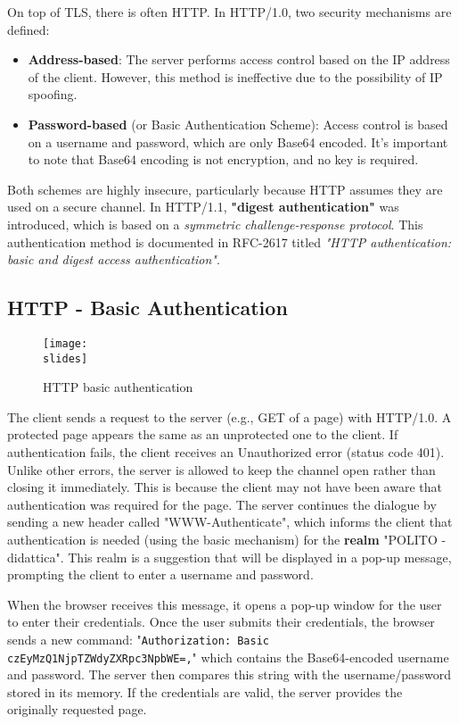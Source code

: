 On top of TLS, there is often HTTP. In HTTP/1.0, two security mechanisms are defined:

\begin{itemize}
    \item \textbf{Address-based}: The server performs access control based on the IP address of the client. However, this method is ineffective due to the possibility of IP spoofing.
    
    \item \textbf{Password-based} (or Basic Authentication Scheme): Access control is based on a username and password, which are only Base64 encoded. It's important to note that Base64 encoding is not encryption, and no key is required.
\end{itemize}

Both schemes are highly insecure, particularly because HTTP assumes they are used on a secure channel. In HTTP/1.1, \textbf{"digest authentication"} was introduced, which is based on a \textit{symmetric challenge-response protocol}. This authentication method is documented in RFC-2617 titled \textit{"HTTP authentication: basic and digest access authentication"}.


\subsection{HTTP - Basic Authentication}

\begin{figure}[h]
    \centering
    \texttt{[image: \\slides]}
    \caption{HTTP basic authentication}
\end{figure}

The client sends a request to the server (e.g., GET of a page) with HTTP/1.0. A protected page appears the same as an unprotected one to the client. If authentication fails, the client receives an Unauthorized error (status code 401). Unlike other errors, the server is allowed to keep the channel open rather than closing it immediately. This is because the client may not have been aware that authentication was required for the page. The server continues the dialogue by sending a new header called "WWW-Authenticate", which informs the client that authentication is needed (using the basic mechanism) for the \textbf{realm} "POLITO - didattica". This realm is a suggestion that will be displayed in a pop-up message, prompting the client to enter a username and password.

When the browser receives this message, it opens a pop-up window for the user to enter their credentials. Once the user submits their credentials, the browser sends a new command: "\texttt{Authorization: Basic czEyMzQ1NjpTZWdyZXRpc3NpbWE=,}" which contains the Base64-encoded username and password. The server then compares this string with the username/password stored in its memory. If the credentials are valid, the server provides the originally requested page.

